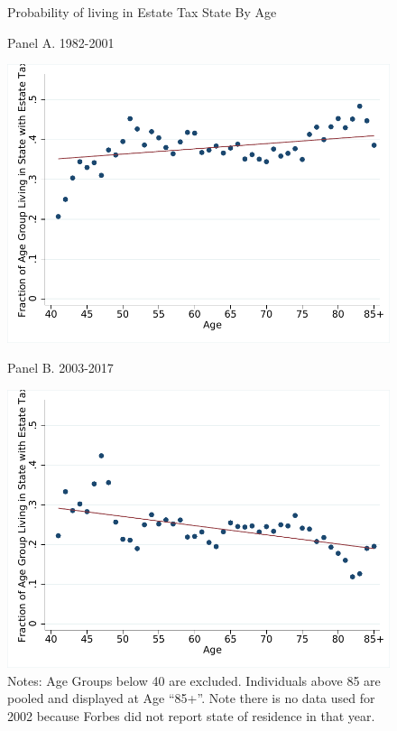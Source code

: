 \documentclass[12pt]{article}
\begin{document}
\begin{figure}
	\centering
	\caption{Probability of living in Estate Tax State By Age}	
	\caption*{Panel A. 1982-2001}
	\includegraphics[width=.75\textwidth]{../Figures/Figure6_a.pdf}
	\caption*{Panel B. 2003-2017}
	\includegraphics[width=.75\textwidth]{../Figures/Figure6_b.pdf}
	\caption*{\footnotesize Notes: Age Groups below 40 are excluded. Individuals above 85 are pooled and displayed at Age ``85+''. Note there is no data used for 2002 because Forbes did not report state of residence in that year.}
\label{fig:binscatterEI_Age}

\vspace{20cm}
\end{figure}

\clearpage
\end{document}
